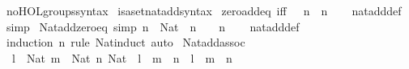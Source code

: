 \begin{isabellebody}
\isanewline
\isanewline
{}\isamarkupfalse%
\ no{\isacharunderscore}{\kern0pt}HOL{\isacharunderscore}{\kern0pt}groups{\isacharunderscore}{\kern0pt}syntax\isanewline
{}\isamarkupfalse%
\ isa{\isacharunderscore}{\kern0pt}set{\isacharunderscore}{\kern0pt}nat{\isacharunderscore}{\kern0pt}add{\isacharunderscore}{\kern0pt}syntax\isanewline
\isanewline
{}\isamarkupfalse%
\ zero{\isacharunderscore}{\kern0pt}add{\isacharunderscore}{\kern0pt}eq\ {\isacharbrackleft}{\kern0pt}iff{\isacharbrackright}{\kern0pt}{\isacharcolon}{\kern0pt}\ {\isachardoublequoteopen}{}\ {\isacharplus}{\kern0pt}\ n\ {\isacharequal}{\kern0pt}\ n{\isachardoublequoteclose}\isanewline
%
\isadelimproof
\ \ %
\endisadelimproof
%
\isatagproof
{}\isamarkupfalse%
\ nat{\isacharunderscore}{\kern0pt}add{\isacharunderscore}{\kern0pt}def\ \isamarkupfalse%
\ simp%
\endisatagproof
{\isafoldproof}%
%
\isadelimproof
\isanewline
%
\endisadelimproof
\isanewline
{}\isamarkupfalse%
\ Nat{\isacharunderscore}{\kern0pt}add{\isacharunderscore}{\kern0pt}zero{\isacharunderscore}{\kern0pt}eq\ {\isacharbrackleft}{\kern0pt}simp{\isacharbrackright}{\kern0pt}{\isacharcolon}{\kern0pt}\ {\isachardoublequoteopen}n\ {\isacharcolon}{\kern0pt}\ Nat\ {\isasymLongrightarrow}\ n\ {\isacharplus}{\kern0pt}\ {}\ {\isacharequal}{\kern0pt}\ n{\isachardoublequoteclose}\isanewline
%
\isadelimproof
\ \ %
\endisadelimproof
%
\isatagproof
{}\isamarkupfalse%
\ nat{\isacharunderscore}{\kern0pt}add{\isacharunderscore}{\kern0pt}def\ \isamarkupfalse%
\ {\isacharparenleft}{\kern0pt}induction\ n\ rule{\isacharcolon}{\kern0pt}\ Nat{\isacharunderscore}{\kern0pt}induct{\isacharparenright}{\kern0pt}\ auto%
\endisatagproof
{\isafoldproof}%
%
\isadelimproof
\isanewline
%
\endisadelimproof
\isanewline
{}\isamarkupfalse%
\ Nat{\isacharunderscore}{\kern0pt}add{\isacharunderscore}{\kern0pt}assoc{\isacharcolon}{\kern0pt}\isanewline
\ \ {\isachardoublequoteopen}{\isasymlbrakk}l\ {\isacharcolon}{\kern0pt}\ Nat{\isacharsemicolon}{\kern0pt}\ m\ {\isacharcolon}{\kern0pt}\ Nat{\isacharsemicolon}{\kern0pt}\ n{\isacharcolon}{\kern0pt}\ Nat{\isasymrbrakk}\ {\isasymLongrightarrow}\ l\ {\isacharplus}{\kern0pt}\ m\ {\isacharplus}{\kern0pt}\ n\ {\isacharequal}{\kern0pt}\ l\ {\isacharplus}{\kern0pt}\ {\isacharparenleft}{\kern0pt}m\ {\isacharplus}{\kern0pt}\ n{\isacharparenright}{\kern0pt}{\isachardoublequoteclose}\isanewline
%
\isadelimproof
\ \ %
\endisadelimproof
%
\isatagproof
{}\isamarkupfalse%

\end{isabellebody}
